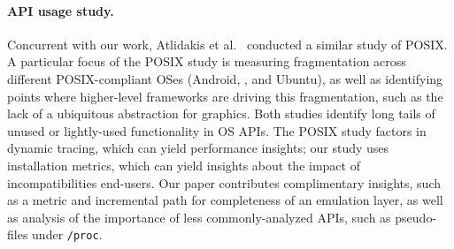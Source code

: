 

\paragraph{API usage study.}
Concurrent with our work, Atlidakis et al.~\citep{atlidakis16posix} conducted a similar 
study of POSIX.
A particular focus of the POSIX study is measuring fragmentation across different POSIX-compliant OSes
(Android, \osx{}, and Ubuntu), as well as identifying points where higher-level frameworks
are driving this fragmentation, such as the lack of a ubiquitous abstraction for graphics.
Both studies identify long tails of unused or lightly-used functionality in OS APIs.
The POSIX study factors in dynamic tracing, which can yield performance insights;
our study uses installation metrics, which can yield insights about the impact of incompatibilities end-users.
Our paper contributes complimentary insights, such as a metric and incremental path for 
completeness of an emulation layer, as well as analysis of the importance of less commonly-analyzed 
APIs, such as pseudo-files under {\tt /proc}.


